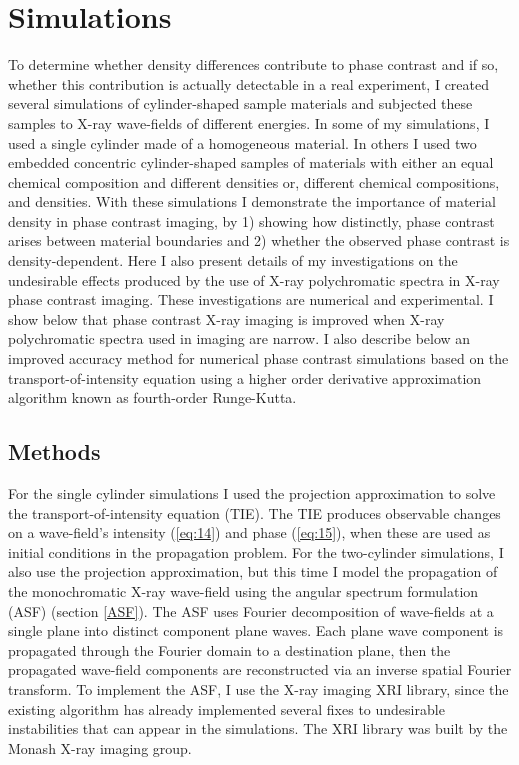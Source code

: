 \documentclass[10pt, a4paper, singlespacing]{report}
\begin{document}
\chapter{Simulations}\label{Simulations}
To determine whether density differences contribute to phase contrast and if so, whether this contribution is actually detectable in a real experiment, I created several simulations of cylinder-shaped sample materials and subjected these samples to X-ray wave-fields of different energies. In some of my simulations, I used a single cylinder made of a homogeneous material. In others I used two embedded concentric cylinder-shaped samples of materials with either an equal chemical composition and different densities or, different chemical compositions, and densities. With these simulations I demonstrate the importance of material density in phase contrast imaging,  by 1) showing how distinctly, phase contrast arises between material boundaries and 2) whether the observed phase contrast is density-dependent. 
Here I also present details of my investigations on the undesirable effects produced by the use of X-ray polychromatic spectra in X-ray phase contrast imaging.
These investigations are numerical and experimental. I show below that phase contrast X-ray imaging is improved when X-ray polychromatic spectra used in imaging are narrow.
I also describe below an improved accuracy method for numerical phase contrast simulations based on the transport-of-intensity equation using a higher order derivative approximation algorithm known as fourth-order Runge-Kutta.

\section{Methods}\label{Methods}
For the single cylinder simulations I used the projection approximation to solve the transport-of-intensity equation (TIE). The TIE produces observable changes on a wave-field's intensity (\ref{eq:14}) and phase (\ref{eq:15}), when these are used as initial conditions in the propagation problem. For the two-cylinder simulations, I also use the projection approximation, but this time I model the propagation of the monochromatic X-ray wave-field using the angular spectrum formulation (ASF) (section \ref{ASF}). The ASF uses Fourier decomposition of wave-fields at a single plane into distinct component plane waves. Each plane wave component is propagated through the Fourier domain to a destination plane, then the propagated wave-field components are reconstructed via an inverse spatial Fourier transform\cite{Goodman}. To implement the ASF, I use the X-ray imaging XRI library, since the existing algorithm has already implemented several fixes to undesirable instabilities that can appear in the simulations. The XRI library was built by the Monash X-ray imaging group.
\end{document}
